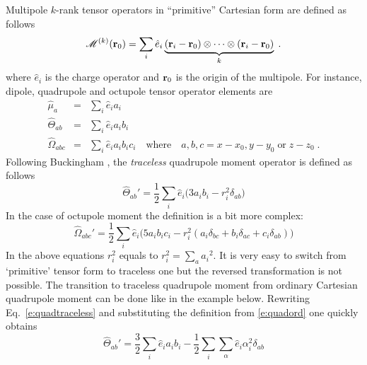 \documentclass[a4paper,titlepage,twoside,fleqn,12pt]{book}
\begin{document}
\begin{appendices}
\begin{refsection}
Multipole $k$-rank tensor operators in ``primitive'' 
Cartesian form are defined as follows
%
\begin{equation} \label{e:m-operator}
\mathscr{M}^{(k)}({\bf r}_0) = \sum_i \hat{e}_i \underbrace{({\mathbf r}_i - {\bf r}_0) 
                      \otimes \cdots \otimes ({\mathbf r}_i - {\bf r}_0)}_{k}  \;.
\end{equation}
%
where $\hat{e}_i$ is the charge operator
and ${\bf r}_0$ is the origin of the multipole. 
For instance, dipole, quadrupole and octupole tensor 
operator elements are
%
\begin{eqnarray}\label{e:quadord}
\hat{\mu}_a         &=& \sum_i \hat{e}_i a_i \\
\hat{\Theta}_{ab}   &=& \sum_i \hat{e}_i a_i b_i \\
\hat{\Omega}_{abc}  &=& \sum_i \hat{e}_i a_i b_i c_i \quad  \textrm{where} \quad a,b,c=x-x_0,y-y_0 \; \textrm{or} \; z-z_0 \;.
\end{eqnarray}
%
Following Buckingham \citep{Buckingham.QRevChemSoc.1959}, the \emph{traceless} 
quadrupole 
moment operator is defined as follows
%
\begin{equation}\label{e:quadtraceless}
\hat{\Theta}_{ab}' = \frac{1}{2}\sum_i \hat{e}_i \big( 3a_ib_i-r_i^2\delta_{ab}\big)
\end{equation}
%
In the case of octupole moment the definition is a bit more 
complex:
\begin{equation}
\hat{\Omega}_{abc}' = \frac{1}{2}\sum_i \hat{e}_i   \big( 5a_ib_ic_i-r_i^2(a_i\delta_{bc}+
                                                                     b_i\delta_{ac}+
                                                                     c_i\delta_{ab})\big) 
\end{equation}
In the above equations $r_i^2$ equals to
%
$r_i^2 = \sum_a {a_i}^2   $.
%
It is very easy to switch from `primitive' tensor form to 
traceless one but the reversed transformation is not possible. 
The transition to traceless
quadrupole moment from ordinary Cartesian quadrupole moment 
can be done like in the example below. Rewriting 
Eq.~\ref{e:quadtraceless} and substituting the definition from 
\ref{e:quadord} one quickly obtains
%
\begin{equation}
\hat{\Theta}_{ab}' = \frac{3}{2}\sum_i \hat{e}_ia_ib_i - \frac{1}{2}\sum_i\sum_{\alpha}\hat{e}_i\alpha_i^2\delta_{ab} 

\end{equation}
\end{refsection}
\end{appendices}
\end{document}
